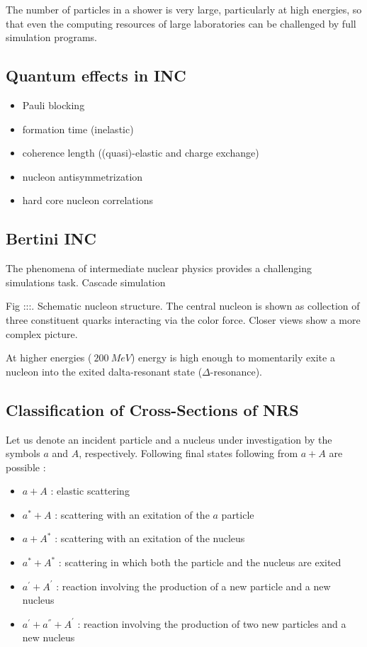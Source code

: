 The number of particles in a shower
    is very large, particularly at high energies, so that even the computing
    resources of large laboratories can be challenged by full simulation programs.

\subsection{Quantum effects in INC}

\begin{itemize}
\item Pauli blocking
\item formation time (inelastic)
\item coherence length ((quasi)-elastic and charge exchange)
\item nucleon antisymmetrization
\item hard core nucleon correlations
\end{itemize}

\subsection{Bertini INC}

The phenomena of intermediate nuclear physics provides a challenging simulations task.
Cascade simulation


Fig :::. Schematic nucleon structure. 
The central nucleon is shown as collection of three constituent quarks interacting via the color force. 
Closer views show a more complex picture.

At higher energies ($~200~MeV$) energy is high enough to momentarily exite a nucleon into the exited dalta-resonant state ($\Delta$-resonance).

\subsection{Classification of Cross-Sections of NRS}

Let us denote an incident particle and a nucleus under investigation by the symbols $a$ and $A$, respectively.
Following final states following from $a + A$ are possible \cite{iljinov94}:

\begin{itemize}
\item $a + A$ :  elastic scattering
\item $a^{*} + A$ :  scattering with an exitation of the $a$ particle
\item $a + A^{*}$ : scattering with an exitation of the nucleus
\item $a^{*} + A^{*}$ : scattering in which both the particle and the nucleus are exited
\item $a^{'} + A^{'}$ : reaction involving the production of a new particle and a new nucleus
\item $a^{'} + a^{''} + A^{'}$ : reaction involving the production of two new particles and a new nucleus
\end{itemize}


